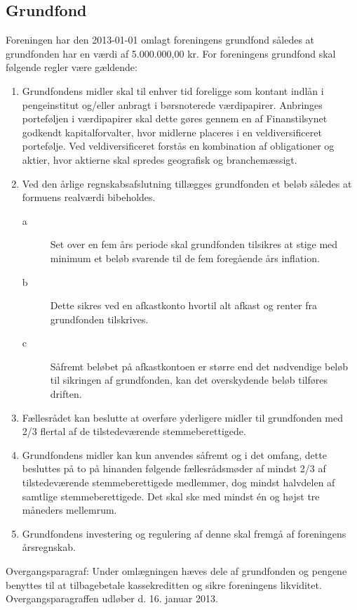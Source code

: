 \begin{list}
\subsection{Grundfond} \label{L:kap:grundfond}
\item Foreningen har den 2013-01-01 omlagt foreningens grundfond således at grundfonden har en værdi af 5.000.000,00 kr. For foreningens grundfond skal følgende regler være gældende:
\begin{enumerate}
\item Grundfondens midler skal til enhver tid foreligge som kontant indlån i pengeinstitut og/eller anbragt i børsnoterede værdipapirer. Anbringes porteføljen i værdipapirer skal dette gøres gennem en af Finanstilsynet godkendt kapitalforvalter, hvor midlerne placeres i en veldiversificeret portefølje. Ved veldiversificeret forstås en kombination af
obligationer og aktier, hvor aktierne skal spredes geografisk og branchemæssigt. 
\item Ved den årlige regnskabsafslutning tillægges grundfonden et beløb således at formuens realværdi bibeholdes.
\begin{description}
\item[a] Set over en fem års periode skal grundfonden tilsikres at stige med minimum et beløb svarende til de fem foregående års inflation.
\item[b] Dette sikres ved en afkastkonto hvortil alt afkast og renter fra grundfonden tilskrives.
\item[c] Såfremt beløbet på afkastkontoen er større end det nødvendige beløb til sikringen af grundfonden, kan det overskydende beløb tilføres driften.
\end{description}
\item Fællesrådet kan beslutte at overføre yderligere midler til grundfonden med 2/3 flertal af de tilstedeværende stemmeberettigede.
\item Grundfondens midler kan kun anvendes såfremt og i det omfang, dette besluttes på to på hinanden følgende fællesrådsmøder af mindst 2/3 af tilstedeværende stemmeberettigede medlemmer, dog mindst halvdelen af samtlige stemmeberettigede. Det skal ske  med mindst én og højst tre måneders mellemrum.
\item Grundfondens investering og regulering af denne skal fremgå af foreningens årsregnskab. 
\end{enumerate}
\item Overgangsparagraf: Under omlægningen hæves dele af grundfonden og pengene benyttes til at tilbagebetale kassekreditten og sikre foreningens likviditet. Overgangsparagraffen udløber d. 16. januar 2013.


\end{list}
